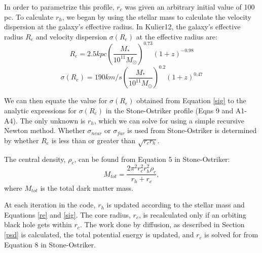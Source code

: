 \documentclass[english, apj]{emulateapj}
\begin{document}
In order to parametrize this profile, $r_c$ was given an arbitrary initial value of 100 pc.  To calculate $r_h$, we began by using the stellar mass to calculate the velocity dispersion at the galaxy's effective radius.  In Kulier12, the galaxy's effective radius $R_{e}$ and velocity dispersion $\sigma(R_e)$ at the effective radius are:
\begin{equation} \label{re}
R_{e} = 2.5 kpc\left(\frac{M_*}{10^{11}M_{\odot}}\right)^{0.73}(1+z)^{-0.98}
\end{equation}
\begin{equation} \label{sig}
\sigma(R_{e}) = 190km/s\left(\frac{M_{*}}{10^{11}M_{\odot}}\right)^{0.2}(1+z)^{0.47}
\end{equation}

We can then equate the value for $\sigma({R_e})$ obtained from Equation \ref{sig} to the analytic expressions for $\sigma(R_{e})$ in the Stone-Ostriker profile (Eqns 9 and A1-A4).  The only unknown is $r_h$, which we can solve for using a simple recursive Newton method.  Whether $\sigma_{near}$ or $\sigma_{far}$ is used from Stone-Ostriker is determined by whether $R_e$ is less than or greater than $\sqrt{r_c r_h}$.

The central density, $\rho_c$, can be found from Equation 5 in Stone-Ostriker:
\begin{equation} \label{rhoc}
M_{tot} = \frac{2\pi^2r_{c}^2r_{h}^2\rho_c}{r_h+r_c},
\end{equation}
where $M_{tot}$ is the total dark matter mass.

At each iteration in the code, $r_h$ is updated according to the stellar mass and Equations \ref{re} and \ref{sig}.  The core radius, $r_c$, is recalculated only if an orbiting black hole gets within $r_c$.  The work done by diffusion, as described in Section \ref{psd} is calculated, the total potential energy is updated, and $r_c$ is solved for from Equation 8 in Stone-Ostriker.
\end{document}
